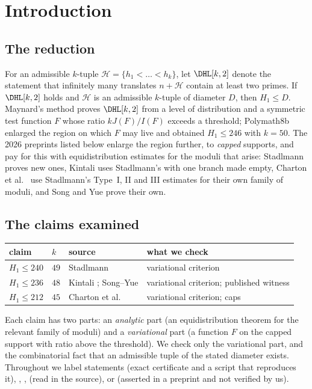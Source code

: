 \section{Introduction}

\subsection*{The reduction}
For an admissible $k$-tuple $\mathcal H=\{h_1<\dots<h_k\}$, let $\DHL[k,2]$
denote the statement that infinitely many translates $n+\mathcal H$ contain at
least two primes. If $\DHL[k,2]$ holds and $\mathcal H$ is an admissible
$k$-tuple of diameter $D$, then $H_1\le D$. Maynard's method \cite{May15}
proves $\DHL[k,2]$ from a level of distribution and a symmetric test function
$F$ whose ratio $kJ(F)/I(F)$ exceeds a threshold; Polymath8b \cite{Pol14b}
enlarged the region on which $F$ may live and obtained $H_1\le246$ with
$k=50$. The 2026 preprints listed below enlarge the region further, to
\emph{capped} supports, and pay for this with equidistribution estimates
for the moduli that arise: Stadlmann \cite{Sta26} proves new ones, Kintali
\cite{Kin26} uses Stadlmann's \cite[Prop.~3]{Sta26} with one branch made empty,
Charton et al.\ \cite{Cha26} use Stadlmann's Type~I, II and III estimates for
their own family of moduli, and Song and Yue \cite{SY26} prove their own.

\subsection*{The claims examined}
\begin{center}
\begin{tabular}{@{}llll@{}}
\toprule
claim & $k$ & source & what we check\\
\midrule
$H_1\le240$ & $49$ & Stadlmann \cite{Sta26} & variational criterion\\
$H_1\le236$ & $48$ & Kintali \cite{Kin26}; Song--Yue \cite{SY26} & variational criterion; published witness\\
$H_1\le212$ & $45$ & Charton et al.\ \cite{Cha26} & variational criterion; caps\\
\bottomrule
\end{tabular}
\end{center}
Each claim has two parts: an \emph{analytic} part (an equidistribution
theorem for the relevant family of moduli) and a \emph{variational} part (a
function $F$ on the capped support with ratio above the threshold). We check
only the variational part, and the combinatorial fact that an admissible
tuple of the stated diameter exists. Throughout we label statements
 (exact certificate and a script that reproduces it),
, ,  (read in the source),
or  (asserted in a preprint and not verified by us).

